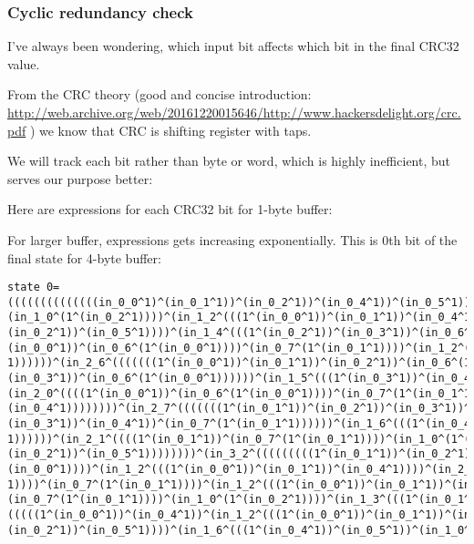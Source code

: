 

\subsubsection{Cyclic redundancy check}

I've always been wondering, which input bit affects which bit in the final CRC32 value.

From the \ac{CRC} theory (good and concise introduction:
\url{http://web.archive.org/web/20161220015646/http://www.hackersdelight.org/crc.pdf}
) we know that \ac{CRC} is shifting register with taps.

We will track each bit rather than byte or word, which is highly inefficient, but serves our purpose better:



Here are expressions for each CRC32 bit for 1-byte buffer:



For larger buffer, expressions gets increasing exponentially.
This is 0th bit of the final state for 4-byte buffer:

\begin{lstlisting}
state 0=((((((((((((((in_0_0^1)^(in_0_1^1))^(in_0_2^1))^(in_0_4^1))^(in_0_5^1))^(in_0_7^(1^(in_0_1^1))))^
(in_1_0^(1^(in_0_2^1))))^(in_1_2^(((1^(in_0_0^1))^(in_0_1^1))^(in_0_4^1))))^(in_1_3^(((1^(in_0_1^1))^
(in_0_2^1))^(in_0_5^1))))^(in_1_4^(((1^(in_0_2^1))^(in_0_3^1))^(in_0_6^(1^(in_0_0^1))))))^(in_2_0^((((1^
(in_0_0^1))^(in_0_6^(1^(in_0_0^1))))^(in_0_7^(1^(in_0_1^1))))^(in_1_2^(((1^(in_0_0^1))^(in_0_1^1))^(in_0_4^
1))))))^(in_2_6^(((((((1^(in_0_0^1))^(in_0_1^1))^(in_0_2^1))^(in_0_6^(1^(in_0_0^1))))^(in_1_4^(((1^(in_0_2^1))^
(in_0_3^1))^(in_0_6^(1^(in_0_0^1))))))^(in_1_5^(((1^(in_0_3^1))^(in_0_4^1))^(in_0_7^(1^(in_0_1^1))))))^
(in_2_0^((((1^(in_0_0^1))^(in_0_6^(1^(in_0_0^1))))^(in_0_7^(1^(in_0_1^1))))^(in_1_2^(((1^(in_0_0^1))^(in_0_1^1))^
(in_0_4^1))))))))^(in_2_7^(((((((1^(in_0_1^1))^(in_0_2^1))^(in_0_3^1))^(in_0_7^(1^(in_0_1^1))))^(in_1_5^(((1^
(in_0_3^1))^(in_0_4^1))^(in_0_7^(1^(in_0_1^1))))))^(in_1_6^(((1^(in_0_4^1))^(in_0_5^1))^(in_1_0^(1^(in_0_2^
1))))))^(in_2_1^((((1^(in_0_1^1))^(in_0_7^(1^(in_0_1^1))))^(in_1_0^(1^(in_0_2^1))))^(in_1_3^(((1^(in_0_1^1))^
(in_0_2^1))^(in_0_5^1))))))))^(in_3_2^(((((((((1^(in_0_1^1))^(in_0_2^1))^(in_0_4^1))^(in_0_5^1))^(in_0_6^(1^
(in_0_0^1))))^(in_1_2^(((1^(in_0_0^1))^(in_0_1^1))^(in_0_4^1))))^(in_2_0^((((1^(in_0_0^1))^(in_0_6^(1^(in_0_0^
1))))^(in_0_7^(1^(in_0_1^1))))^(in_1_2^(((1^(in_0_0^1))^(in_0_1^1))^(in_0_4^1))))))^(in_2_1^((((1^(in_0_1^1))^
(in_0_7^(1^(in_0_1^1))))^(in_1_0^(1^(in_0_2^1))))^(in_1_3^(((1^(in_0_1^1))^(in_0_2^1))^(in_0_5^1))))))^(in_2_4^
(((((1^(in_0_0^1))^(in_0_4^1))^(in_1_2^(((1^(in_0_0^1))^(in_0_1^1))^(in_0_4^1))))^(in_1_3^(((1^(in_0_1^1))^
(in_0_2^1))^(in_0_5^1))))^(in_1_6^(((1^(in_0_4^1))^(in_0_5^1))^(in_1_0^(1^(in_0_2^1))))))))))
\end{lstlisting}

